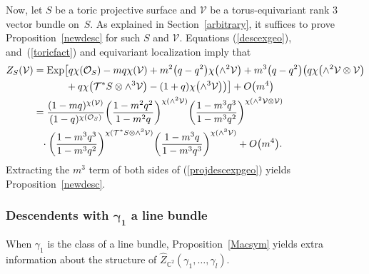 \documentclass[pdftex]{sigma}
\numberwithin{equation}{section}
\newcommand{\Exp}{\mathrm{Exp}}
\def\C{\mathbb C}
\begin{document}
Now, let $S$ be a toric projective surface and $\mathcal{V}$ be a torus-equivariant rank 3 vector bundle on~$S$. As explained in Section~\ref{arbitrary}, it suffices to prove Proposition~\ref{newdesc} for such $S$ and $\mathcal{V}$. Equations (\ref{descexgeo}), and~(\ref{toricfact}) and equivariant localization imply that
\begin{align}
Z_{S}(\mathcal{V})&=\Exp\big[ q\chi(\mathcal{O}_S)-mq\chi(\mathcal{V})+m^2\big(q-q^2\big)\chi\big({\wedge}^2\mathcal{V}\big)+m^3\big(q-q^2\big) \big(q\chi\big({\wedge}^2\mathcal{V}\otimes \mathcal{V}\big)\nonumber
\\
&\hphantom{=\Exp\big[}+q\chi\big(\mathcal{T}^*S\otimes\wedge^3\mathcal{V}\big) -(1+q)\chi\big({\wedge}^3\mathcal{V}\big)\big)\big]+ O\big(m^4\big) \nonumber
\\
&=\frac{(1-mq)^{\chi(\mathcal{V})}}{(1-q)^{\chi(\mathcal{O}_S )}}\bigg(\frac{1-m^2q^2}{1-m^2q}\bigg)^{\chi(\wedge^2\mathcal{V})}\nonumber
\bigg(\frac{1-m^3q^3}{1-m^3q^2}\bigg)^{\chi(\wedge^2\mathcal{V}\otimes\mathcal{V})}
\\
&\phantom{=}\cdot\bigg(\frac{1-m^3q^3}{1-m^3q^2}\bigg)^{\chi(\mathcal{T}^*S\otimes \wedge^3\mathcal{V})}\bigg(\frac{1-m^3q}{1-m^3q^3}\bigg)^{\chi(\wedge^3\mathcal{V})}+O\big(m^4\big) .
\label{projdescexpgeo}
\end{align}
Extracting the $m^3$ term of both sides of (\ref{projdescexpgeo}) yields Proposition~\ref{newdesc}.


\subsubsection[Descendents with gamma\_1 a line bundle]{Descendents with $\boldsymbol{\gamma_1}$ a line bundle}\label{lbdescpf}

When $\gamma_1$ is the class of a line bundle, Proposition~\ref{Macsym} yields extra information about the structure of $\hat{Z}_{\C^2}(\gamma_1,\dots,\gamma_l)$.
\end{document}
